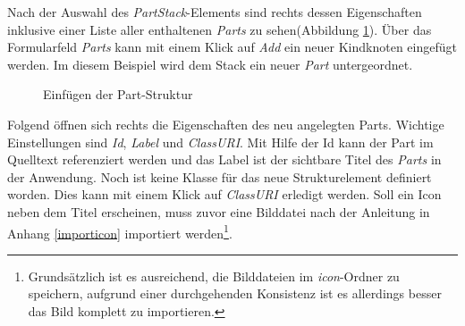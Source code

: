 Nach der Auswahl des \textit{PartStack}-Elements sind rechts dessen Eigenschaften inklusive einer Liste aller enthaltenen \textit{Parts} zu sehen(Abbildung \ref{partadd}). Über das Formularfeld \textit{Parts} kann mit einem Klick auf \textit{Add} ein neuer Kindknoten eingefügt werden. Im diesem Beispiel wird dem Stack ein neuer \textit{Part} untergeordnet.

\begin{figure}[H]
  \vspace{0.5cm}
  \centering
   \caption{Einfügen der Part-Struktur}
  \label{partadd}
  \vspace{0.5cm}
\end{figure}

Folgend öffnen sich rechts die Eigenschaften des neu angelegten Parts. Wichtige Einstellungen sind \textit{Id}, \textit{Label} und \textit{ClassURI}. Mit Hilfe der Id kann der Part im Quelltext referenziert werden und das Label ist der sichtbare Titel des \textit{Parts} in der Anwendung. Noch ist keine Klasse für das neue Strukturelement definiert worden. Dies kann mit einem Klick auf \textit{ClassURI} erledigt werden. Soll ein Icon neben dem Titel erscheinen, muss zuvor eine Bilddatei nach der Anleitung in Anhang \ref{importicon} importiert werden\footnote{Grundsätzlich ist es ausreichend, die Bilddateien im \textit{icon}-Ordner zu speichern, aufgrund einer durchgehenden Konsistenz ist es allerdings besser das Bild komplett zu importieren.}.

